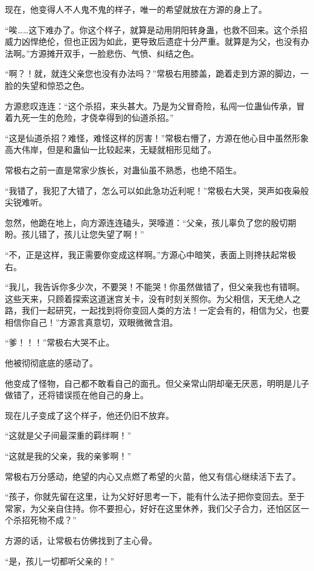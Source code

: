 \begin{this_body}
现在，他变得人不人鬼不鬼的样子，唯一的希望就放在方源的身上了。

“唉……这下难办了。你这个样子，就算是动用阴阳转身蛊，也救不回来。这个杀招威力凶悍绝伦，但也正因为如此，更导致后遗症十分严重。就算是为父，也没有办法啊。”方源摊开双手，一脸悲伤、气愤、纠结之色。

“啊？！就，就连父亲您也没有办法吗？”常极右用膝盖，跪着走到方源的脚边，一脸的失望和惊恐之色。

方源悲叹连连：“这个杀招，来头甚大。乃是为父冒奇险，私闯一位蛊仙传承，冒着九死一生的危险，才侥幸得到的仙道杀招。”

“这是仙道杀招？难怪，难怪这样的厉害！”常极右懵了，方源在他心目中虽然形象高大伟岸，但是和蛊仙一比较起来，无疑就相形见绌了。

常极右之前一直是常家少族长，对蛊仙虽不熟悉，也绝不陌生。

“我错了，我犯了大错了，怎么可以如此急功近利呢！”常极右大哭，哭声如夜枭般尖锐难听。

忽然，他跪在地上，向方源连连磕头，哭嚎道：“父亲，孩儿辜负了您的殷切期盼。孩儿错了，孩儿让您失望了啊！”

“不，正是这样，我正需要你变成这样啊。”方源心中暗笑，表面上则搀扶起常极右。

“我儿，我告诉你多少次，不要哭！不能哭！你虽然做错了，但父亲我也有错啊。这些天来，只顾着探索这道迷宫关卡，没有时刻关照你。为父相信，天无绝人之路，我们一起研究，一起找到将你变回人类的方法！一定会有的，相信为父，也要相信你自己！”方源言真意切，双眼微微含泪。

“爹！！！”常极右大哭不止。

他被彻彻底底的感动了。

他变成了怪物，自己都不敢看自己的面孔。但父亲常山阴却毫无厌恶，明明是儿子做错了，还将错误揽在他自己的身上。

现在儿子变成了这个样子，他还仍旧不放弃。

“这就是父子间最深重的羁绊啊！”

“这就是我的父亲，我的亲爹啊！”

常极右万分感动，绝望的内心又点燃了希望的火苗，他又有信心继续活下去了。

“孩子，你就先留在这里，让为父好好思考一下，能有什么法子把你变回去。至于常家，为父亲自住持。你不要担心，好好在这里休养，我们父子合力，还怕区区一个杀招死物不成？”

方源的话，让常极右仿佛找到了主心骨。

“是，孩儿一切都听父亲的！”

\end{this_body}

